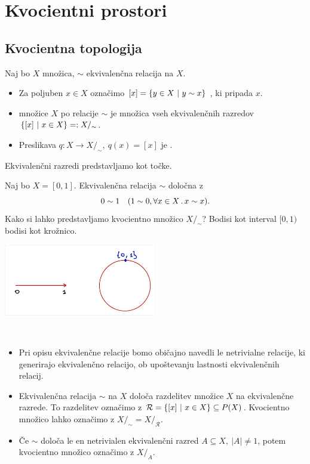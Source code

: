 \section{Kvocientni prostori}
\subsection{Kvocientna topologija}
\begin{definicija}
    Naj bo \(X\) množica, \(\sim\) ekvivalenčna relacija na \(X\). 
    \begin{itemize}
        \item Za poljuben \(x \in X\) označimo \([x] = \left\{y \in X \ | \ y \sim x\right\}\) , ki pripada \(x\).
        \item {} množice \(X\) po relacije \(\sim\) je množica vseh ekvivalenčnih razredov \(\left\{[x] \ | \ x \in X\right\} =: X/_\sim\).
        \item Preslikava \(q: X \to X/_\sim, \ q(x) = [x]\) je .
    \end{itemize}    
\end{definicija}

\begin{opomba}
    Ekvivalenčni razredi predstavljamo kot točke.
\end{opomba}

\begin{primer}
    Naj bo \(X = [0, 1]\). Ekvivalenčna relacija \(\sim\) določna z \[0 \sim 1 \quad (1 \sim 0, \forall x \in X \,.\,x \sim x).\]
    Kako si lahko predstavljamo kvocientno množico \(X/_\sim\)? Bodisi kot interval \([0,1)\) bodisi kot krožnico.
    \begin{center}
        \includegraphics[width=0.5\textwidth]{img/01_001.jpg}      
    \end{center}
\end{primer}

\begin{opomba}
    \
    \begin{itemize}
        \item Pri opisu ekvivalenčne relacije bomo običajno navedli le netrivialne relacije, ki generirajo ekvivalenčno relacijo, ob upoštevanju lastnosti ekvivalenčnih relacij.
        \item Ekvivalenčna relacija \(\sim\) na \(X\) določa razdelitev množice \(X\) na ekvivalenčne razrede. To razdelitev označimo z \(\mathcal{R} = \left\{[x] \ | \ x \in X\right\} \subseteq P(X)\). Kvocientno množico lahko označimo z \(X/_\sim = X/_\mathcal{R}\).
        \item Če \(\sim\) določa le en netrivialen ekvivalenčni razred \(A \subseteq X, \ |A| \neq 1\), potem kvocientno množico označimo z \(X/_A\).
    \end{itemize}
\end{opomba}


